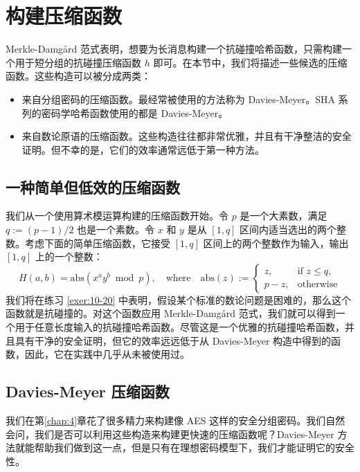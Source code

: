 \section{构建压缩函数}\label{sec:8-5}

Merkle-Damg{\aa}rd 范式表明，想要为长消息构建一个抗碰撞哈希函数，只需构建一个用于短分组的抗碰撞压缩函数 $h$ 即可。在本节中，我们将描述一些候选的压缩函数。这些构造可以被分成两类：
\begin{itemize}
	\item 来自分组密码的压缩函数。最经常被使用的方法称为 Davies-Meyer。SHA 系列的密码学哈希函数使用的都是 Davies-Meyer。
	\item 来自数论原语的压缩函数。这些构造往往都非常优雅，并且有干净整洁的安全证明。但不幸的是，它们的效率通常远低于第一种方法。
\end{itemize}

\subsection{一种简单但低效的压缩函数}\label{subsec:8-5-1}

我们从一个使用算术模运算构建的压缩函数开始。令 $p$ 是一个大素数，满足 $q:=(p-1)/2$ 也是一个素数。令 $x$ 和 $y$ 是从 $[1,q]$ 区间内适当选出的两个整数。考虑下面的简单压缩函数，它接受 $[1,q]$ 区间上的两个整数作为输入，输出 $[1,q]$ 上的一个整数：
\begin{equation}\label{eq:8-3}
H(a,b)=\mathrm{abs}(x^ay^b\bmod p),
\quad\text{where}\quad
\mathrm{abs}(z):=\left\{
\begin{array}{ll}
z, & \text{if } z\leq q,\\
p-z, & \text{otherwise}
\end{array}
\right.
\end{equation}
我们将在练习 \ref{exer:10-20} 中表明，假设某个标准的数论问题是困难的，那么这个函数就是抗碰撞的。对这个函数应用 Merkle-Damg{\aa}rd 范式，我们就可以得到一个用于任意长度输入的抗碰撞哈希函数。尽管这是一个优雅的抗碰撞哈希函数，并且具有干净的安全证明，但它的效率远远低于从 Davies-Meyer 构造中得到的函数，因此，它在实践中几乎从未被使用过。

\subsection{Davies-Meyer 压缩函数}\label{subsec:8-5-2}

我们在第\ref{chap:4}章花了很多精力来构建像 AES 这样的安全分组密码。我们自然会问，我们是否可以利用这些构造来构建更快速的压缩函数呢？Davies-Meyer 方法就能帮助我们做到这一点，但是只有在理想密码模型下，我们才能证明它的安全性。

